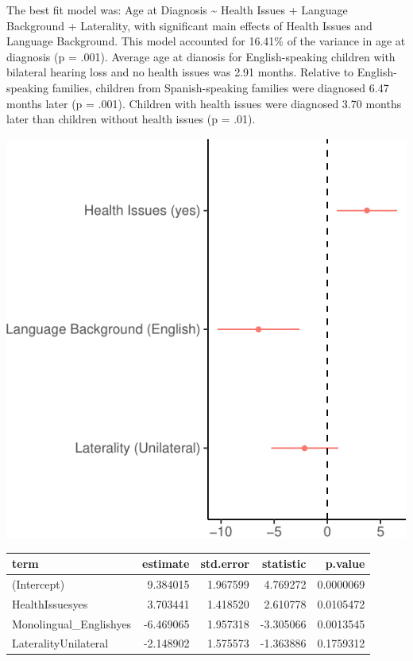\documentclass[
  english,
  man]{apa6}
\begin{document}
The best fit model was: Age at Diagnosis \textasciitilde{} Health Issues + Language Background + Laterality, with significant main effects of Health Issues and Language Background. This model accounted for 16.41\% of the variance in age at diagnosis (p = .001). Average age at dianosis for English-speaking children with bilateral hearing loss and no health issues was 2.91 months. Relative to English-speaking families, children from Spanish-speaking families were diagnosed 6.47 months later (p = .001). Children with health issues were diagnosed 3.70 months later than children without health issues (p = .01).

\includegraphics{ELSSP_paper_files/figure-latex/diagnosis-betas-1.pdf}

\begin{table}[H]
\centering
\begin{tabular}{l|r|r|r|r}
\hline
term & estimate & std.error & statistic & p.value\\
\hline
(Intercept) & 9.384015 & 1.967599 & 4.769272 & 0.0000069\\
\hline
HealthIssuesyes & 3.703441 & 1.418520 & 2.610778 & 0.0105472\\
\hline
Monolingual\_Englishyes & -6.469065 & 1.957318 & -3.305066 & 0.0013545\\
\hline
LateralityUnilateral & -2.148902 & 1.575573 & -1.363886 & 0.1759312\\
\hline
\end{tabular}
\end{table}
\end{document}
